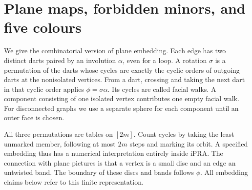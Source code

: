 \section{Plane maps, forbidden minors, and five colours}\label{sec:plane}
We give the combinatorial version of plane embedding. Each edge has two
distinct darts paired by an involution $\alpha$, even for a loop. A rotation
$\sigma$ is a permutation of the darts whose cycles are exactly the cyclic
orders of outgoing darts at the nonisolated vertices. From a dart, crossing
and taking the next dart in that cyclic order applies $\phi=\sigma\alpha$.
Its cycles are called facial walks. A component consisting of one isolated
vertex contributes one empty facial walk. For disconnected graphs we use a
separate sphere for each component until an outer face is chosen.

All three permutations are tables on $[2m]$. Count cycles by taking the least
unmarked member, following at most $2m$ steps and marking its orbit. A
specified embedding thus has a numerical interpretation entirely inside iPRA.
The connection with plane pictures is that a vertex is a small disc and
an edge an untwisted band. The boundary of these discs and bands follows
$\phi$. All embedding claims below refer to this finite representation.

